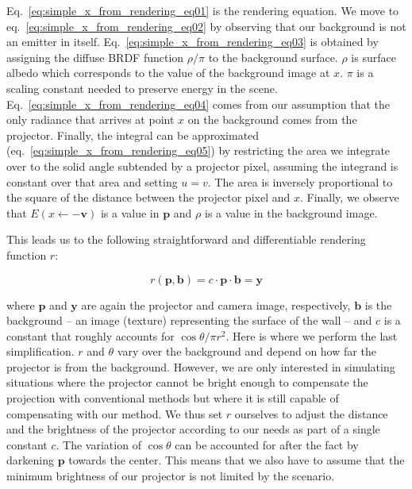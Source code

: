 Eq.~\ref{eq:simple_x_from_rendering_eq01} is the rendering equation. We move to eq.~\ref{eq:simple_x_from_rendering_eq02} by observing that our background is not an emitter in itself. Eq.~\ref{eq:simple_x_from_rendering_eq03} is obtained by assigning the diffuse BRDF function \(\rho / \pi\) to the background surface. \(\rho\) is surface albedo which corresponds to the value of the background image at \(x\). \(\pi\) is a scaling constant needed to preserve energy in the scene. Eq.~\ref{eq:simple_x_from_rendering_eq04} comes from our assumption that the only radiance that arrives at point \(x\) on the background comes from the projector. Finally, the integral can be approximated (eq.~\ref{eq:simple_x_from_rendering_eq05}) by restricting the area we integrate over to the solid angle subtended by a projector pixel, assuming the integrand is constant over that area and setting \(u = v\). The area is inversely proportional to the square of the distance between the projector pixel and \(x\). Finally, we observe that \(E(x \leftarrow \mathbf{-v})\) is a value in \(\bm{p}\) and \(\rho\) is a value in the background image.

This leads us to the following straightforward and differentiable rendering function \(r\):

\begin{equation}
    \label{eq:rendering_function-simple}
    r(\bm{p}, \bm{b}) = c \cdot \bm{p} \cdot \bm{b} = \bm{y}
\end{equation}

where \(\bm{p}\) and \(\bm{y}\) are again the projector and camera image, respectively, \(\bm{b}\) is the background -- an image (texture) representing the surface of the wall -- and \(c\) is a constant that roughly accounts for \(\cos \theta / \pi r^2\). Here is where we perform the last simplification. \(r\) and \(\theta\) vary over the background and depend on how far the projector is from the background. However, we are only interested in simulating situations where the projector cannot be bright enough to compensate the projection with conventional methods but where it is still capable of compensating with our method. We thus set \(r\) ourselves to adjust the distance and the brightness of the projector according to our needs as part of a single constant \(c\). The variation of \(\cos \theta\) can be accounted for after the fact by darkening \(\bm{p}\) towards the center. This means that we also have to assume that the minimum brightness of our projector is not limited by the scenario.

